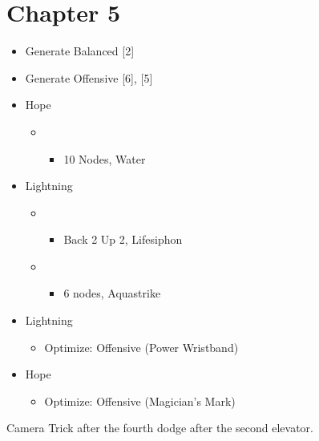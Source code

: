\chapter{Chapter 5}


\renewcommand{\first}{[1] Slash \& Burn (\rav/\com)}
\renewcommand{\second}{[2] War \& Peace (\med/\com)}
\renewcommand{\third}{[3] Supersoldier (\syn/\com)}
\renewcommand{\fourth}{[4] Dualcasting (\rav/\rav)}
\renewcommand{\fifth}{[5] Dualcasting (\rav/\rav)}
\renewcommand{\sixth}{[6] Slash \& Burn (\rav/\com)}
	\begin{menu}
		\begin{itemize}
			\paradigm
			\begin{itemize}
				\item Generate Balanced [2]
				\item Generate Offensive [6], [5]
			\end{itemize}
			\crystarium
			\begin{itemize}
				\item Hope
				      \begin{itemize}
					      \item \rav
					            \begin{itemize}
						            \item 10 Nodes, Water
					            \end{itemize}
				      \end{itemize}
				\item Lightning
				      \begin{itemize}
					      \item \com
					            \begin{itemize}
						            \item Back 2 Up 2, Lifesiphon
					            \end{itemize}
					      \item \rav
					            \begin{itemize}
						            \item 6 nodes, Aquastrike
					            \end{itemize}
				      \end{itemize}
			\end{itemize}
			\equip
			\begin{itemize}
				\item Lightning
				      \begin{itemize}
					      \item Optimize: Offensive (Power Wristband)
				      \end{itemize}
				\item Hope
				      \begin{itemize}
					      \item Optimize: Offensive (Magician's Mark)
				      \end{itemize}
			\end{itemize}
		\end{itemize}
	\end{menu}
	Camera Trick after the fourth dodge after the second elevator.

